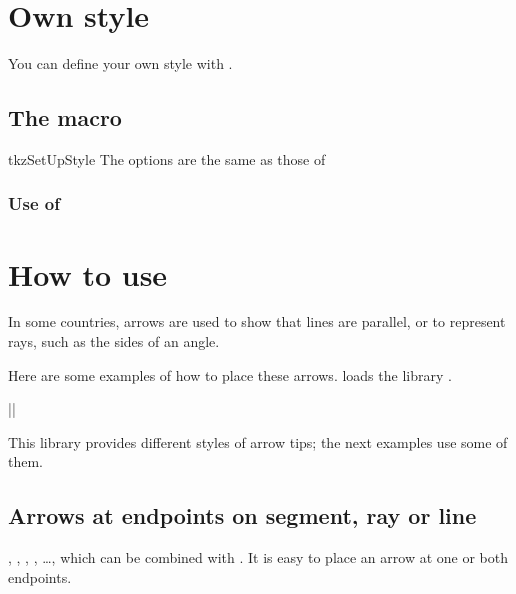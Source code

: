 \section{Own style}
You can define your own style with .

\subsection{The macro  }
\begin{NewMacroBox}{tkzSetUpStyle}{}%
  The options are the same as those of \TIKZ
\end{NewMacroBox}

\subsubsection{Use of }
\begin{tkzexample}[latex=2cm,small]
\end{tkzexample}

\section{How to use }

In some countries, arrows are used to show that lines are parallel,
or to represent rays, such as the sides of an angle.

Here are some examples of how to place these arrows.
 loads the library .
 
|\usetikzlibrary{arrows.meta}|

This library provides different styles of arrow tips; the next examples use some of them.

\subsection{Arrows at endpoints on segment, ray or line}
, , , , \dots, which can be combined with . It is easy to place an arrow at one or both endpoints.

